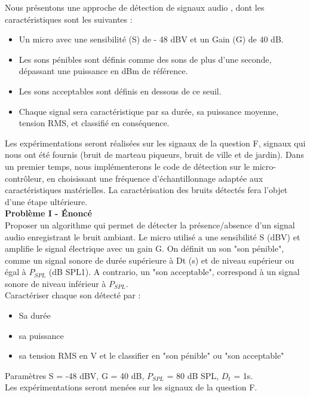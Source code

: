 Nous présentons une approche de détection de signaux audio , dont les caractéristiques sont les suivantes :
\begin{itemize}
    \item Un micro avec une sensibilité (S) de - 48 dBV et un Gain (G) de 40 dB.
    \item Les sons pénibles sont définis comme des sons de plus d'une seconde, dépassant une puissance en dBm de référence.
    \item Les sons acceptables sont définis en dessous de ce seuil.
    \item Chaque signal sera caractéristique par sa durée, sa puissance moyenne, tension RMS, et classifié en conséquence. 
\end{itemize}

Les expérimentations seront réalisées sur les signaux de la question F, signaux qui nous ont été fournis (bruit de marteau piqueurs, bruit de ville et de jardin). Dans un premier temps, nous implémenterons le code de détection sur le micro-contrôleur, en choisissant une fréquence d'échantillonnage adaptée aux caractéristiques matérielles. La caractérisation des bruits détectés fera l'objet d'une étape ultérieure.
\newline 
\\
 \textbf{Problème I - Énoncé } \ \\
Proposer un algorithme qui permet de détecter la présence/absence d’un signal audio enregistrant le bruit ambiant.
Le micro utilisé a une sensibilité S (dBV) et amplifie le signal électrique avec un gain G. On définit un son "son pénible", comme un signal sonore de durée supérieure à Dt (s) et de niveau supérieur ou égal à $P_{SPL}$ (dB SPL1). A contrario, un "son acceptable", correspond à un signal sonore de niveau inférieur à $P_{SPL}$.
\\
Caractériser chaque son détecté par :
\begin{itemize}
    \item Sa durée 
    \item sa puissance
    \item sa tension RMS en V et le classifier en "son pénible" ou "son acceptable"
\end{itemize}
Paramètres S = -48 dBV, G = 40 dB, $P_{SPL}$ = 80 dB SPL, $D_t$ = 1s.
\\
Les expérimentations seront menées sur les signaux de la question F.







